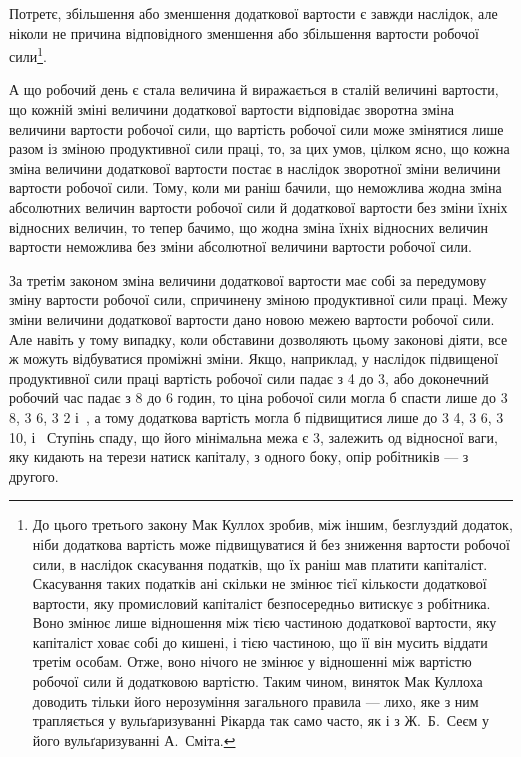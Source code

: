 Потретє, збільшення або зменшення додаткової вартости є
завжди наслідок, але ніколи не причина відповідного зменшення
або збільшення вартости робочої сили\footnote{
До цього третього закону Мак Куллох зробив, між іншим, безглуздий
додаток, ніби додаткова вартість може підвищуватися й без зниження
вартости робочої сили, в наслідок скасування податків, що їх раніш мав
платити капіталіст. Скасування таких податків ані скільки не змінює
тієї кількости додаткової вартости, яку промисловий капіталіст безпосередньо
витискує з робітника. Воно змінює лише відношення між тією
частиною додаткової вартости, яку капіталіст ховає собі до кишені, і
тією частиною, що її він мусить віддати третім особам. Отже, воно нічого не
змінює у відношенні між вартістю робочої сили й додатковою вартістю.
Таким чином, виняток Мак Куллоха доводить тільки його нерозуміння
загального правила — лихо, яке з ним трапляється у вульґаризуванні
Рікарда так само часто, як і з Ж.~Б.~Сеєм у його вульґаризуванні А.~Сміта.
}.

А що робочий день є стала величина й виражається в сталій
величині вартости, що кожній зміні величини додаткової вартости
відповідає зворотна зміна величини вартости робочої сили, що
вартість робочої сили може змінятися лише разом із зміною продуктивної
сили праці, то, за цих умов, цілком ясно, що кожна
зміна величини додаткової вартости постає в наслідок зворотної
зміни величини вартости робочої сили. Тому, коли ми раніш
бачили, що неможлива жодна зміна абсолютних величин вартости
робочої сили й додаткової вартости без зміни їхніх відносних
величин, то тепер бачимо, що жодна зміна їхніх відносних
величин вартости неможлива без зміни абсолютної величини вартости
робочої сили.

За третім законом зміна величини додаткової вартости має
собі за передумову зміну вартости робочої сили, спричинену
зміною продуктивної сили праці. Межу зміни величини додаткової
вартости дано новою межею вартости робочої сили. Але навіть
у тому випадку, коли обставини дозволяють цьому законові
діяти, все ж можуть відбуватися проміжні зміни. Якщо, наприклад,
у наслідок підвищеної продуктивної сили праці вартість
робочої сили падає з 4 до 3, або доконечний робочий час
падає з 8 до 6 годин, то ціна робочої сили могла б спасти лише до
3 8, 3 6, 3 2
і~, а тому додаткова вартість могла б підвищитися лише до
3 4, 3 6, 3 10,
і~ Ступінь спаду, що його мінімальна межа є 3,
залежить од відносної ваги, яку кидають на терези натиск капіталу,
з одного боку, опір робітників — з другого.

